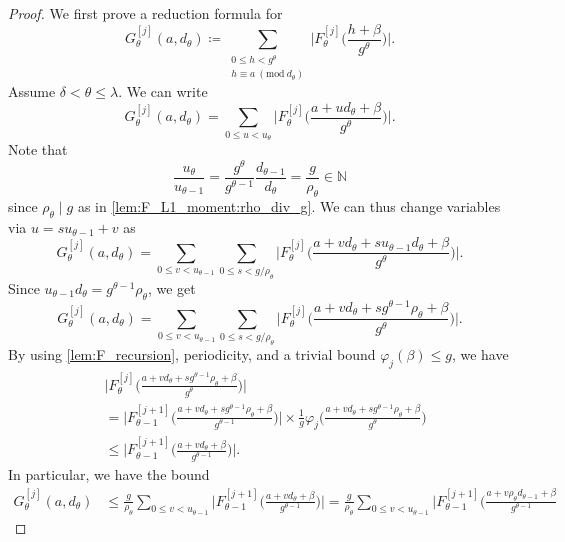 \documentclass[hidelinks]{amsart}
\numberwithin{equation}{section}
\theoremstyle{plain}
\theoremstyle{definition}
\let\tmp\phi
\let\phi\varphi
\let\varphi\tmp
\let\tmp\epsilon
\let\epsilon\varepsilon
\let\varepsilon\tmp
\renewcommand{\mod}[1]{(\mathrm{mod}\ #1)}
\begin{document}
\begin{proof}
We first prove a reduction formula for
\[
G_{\theta}^{[j]}(a,d_{\theta})
\coloneqq
\sum_{\substack{
0\le h<g^{\theta}\\
h\equiv a\ \mod{d_{\theta}}
}}
\biggl|F_{\theta}^{[j]}\biggl(\frac{h+\beta}{g^{\theta}}\biggr)\biggr|.
\]
Assume $\delta<\theta\le\lambda$. We can write
\[
G_{\theta}^{[j]}(a,d_{\theta})
=
\sum_{0\le u<u_{\theta}}
\biggl|F_{\theta}^{[j]}\biggl(\frac{a+ud_{\theta}+\beta}{g^{\theta}}\biggr)\biggr|.
\]
Note that
\begin{equation}
\label{lem:F_L1_moment:u_div_u}
\frac{u_{\theta}}{u_{\theta-1}}
=
\frac{g^{\theta}}{g^{\theta-1}}
\frac{d_{\theta-1}}{d_{\theta}}
=
\frac{g}{\rho_{\theta}}
\in\mathbb{N}
\end{equation}
since $\rho_{\theta}\mid g$ as in \cref{lem:F_L1_moment:rho_div_g}. We can thus change variables via $u=su_{\theta-1}+v$ as
\[
G_{\theta}^{[j]}(a,d_{\theta})
=
\sum_{0\le v<u_{\theta-1}}
\sum_{0\le s<g/\rho_{\theta}}
\biggl|F_{\theta}^{[j]}\biggl(
\frac{a+vd_{\theta}+su_{\theta-1}d_{\theta}+\beta}{g^{\theta}}
\biggr)\biggr|.
\]
Since $u_{\theta-1}d_{\theta}=g^{\theta-1}\rho_{\theta}$, we get
\begin{equation}
\label{lem:L1_moment:first_step}
G_{\theta}^{[j]}(a,d_{\theta})
=
\sum_{0\le v<u_{\theta-1}}
\sum_{0\le s<g/\rho_{\theta}}
\biggl|F_{\theta}^{[j]}\biggl(
\frac{a+vd_{\theta}+sg^{\theta-1}\rho_{\theta}+\beta}{g^{\theta}}
\biggr)\biggr|.
\end{equation}
By using \cref{lem:F_recursion}, periodicity, and a trivial bound $\phi_{j}(\beta)\le g$, we have
\begin{align}
&\biggl|F_{\theta}^{[j]}\biggl(
\frac{a+vd_{\theta}+sg^{\theta-1}\rho_{\theta}+\beta}{g^{\theta}}
\biggr)\biggr|\\
&=
\biggl|F_{\theta-1}^{[j+1]}\biggl(
\frac{a+vd_{\theta}+sg^{\theta-1}\rho_{\theta}+\beta}{g^{\theta-1}}
\biggr)\biggr|
\times
\frac{1}{g}
\phi_{j}\biggl(
\frac{a+vd_{\theta}+sg^{\theta-1}\rho_{\theta}+\beta}{g^{\theta}}
\biggr)\\
&\le
\biggl|F_{\theta-1}^{[j+1]}\biggl(
\frac{a+vd_{\theta}+\beta}{g^{\theta-1}}
\biggr)\biggr|.
\end{align}
In particular, we have the bound
\begin{align}
G_{\theta}^{[j]}(a,d_{\theta})
&\le
\frac{g}{\rho_{\theta}}
\sum_{0\le v<u_{\theta-1}}
\biggl|F_{\theta-1}^{[j+1]}\biggl(
\frac{a+vd_{\theta}+\beta}{g^{\theta-1}}
\biggr)\biggr|
=
\frac{g}{\rho_{\theta}}
\sum_{0\le v<u_{\theta-1}}
\biggl|F_{\theta-1}^{[j+1]}\biggl(
\frac{a+v\rho_{\theta}d_{\theta-1}+\beta}{g^{\theta-1}}

\end{align}
\end{proof}
\end{document}
